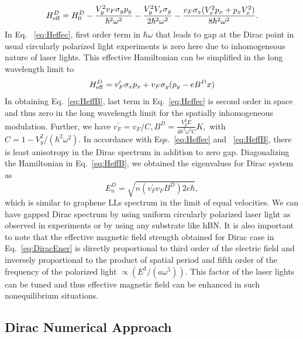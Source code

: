 \begin{equation} \label{eq:Heffec}
	H_{\rm eff}^D=H_{0}^D-\frac{V_{y}^{2}v_F\sigma_{y}p_{y}}{\hbar^{2}\omega^{2}}
	-\frac{V_{y}^{2}V_{x}\sigma_{y}}{2\hbar^{2}\omega^{2}}-\frac{v_F\sigma
		_{x}(V_{x}^{2}p_{x}+p_{x}V_{x}^{2})}{8\hbar^{2}\omega^{2}}.
\end{equation}
In Eq. ~\eqref{eq:Heffec}, first order term in $\hbar \omega$ that leads to gap at the Dirac point in usual circularly polarized light experiments \cite{YHW, JWM} is zero here due to inhomogeneous nature of laser lights. This effective Hamiltonian can be simplified in the long wavelength limit to
\begin{equation} \label{eq:HeffB}
H_{\rm eff}^D = v_{F}^{\prime}\sigma_{x}p_{x}+v_F\sigma_{y}(p_{y}-eB^Dx)
\end{equation}%
In obtaining Eq.~\eqref{eq:HeffB}, last term in Eq.~\eqref{eq:Heffec} is second order in space and thus zero in the long wavelength limit for the spatially inhomogeneous modulation. Further, we have $v_{F}^{\prime}=v_F/C,B^D=\frac{V_{y}^{2}E}{4\hbar^{2}\omega^{3}C}K,$ with $C=1-V_{y}^{2}/(\hbar^{2}\omega^{2})$. In accordance with Eqs.~\eqref{eq:Heffec} and ~\eqref{eq:HeffB}, there is least anisotropy in the Dirac spectrum in addition to zero gap. Diagonalizing the Hamiltonian in Eq.~\eqref{eq:HeffB}, we obtained the eigenvalues for Dirac system as%
\begin{equation} \label{eq:DiracEner}
	E_{n}^D=\sqrt{n(v_{F}^{\prime}v_FB^D)2e\hbar},
\end{equation}
which is similar to graphene LLs spectrum in the limit of equal velocities. We can have gapped Dirac spectrum by using uniform circularly polarized laser light as observed in experiments \cite{YHW, JWM} or by using any substrate like hBN. It is also important to note that the effective magnetic field strength obtained for Dirac case in Eq.~\eqref{eq:DiracEner} is directly proportional to third order of the electric field and inversely proportional to the product of spatial period and fifth order of the frequency of the polarized light $\propto (E^3/(a\omega^5))$. This factor of the laser lights can be tuned and thus effective magnetic field can be enhanced in such nonequilibrium situations.

\subsection{Dirac Numerical Approach}

